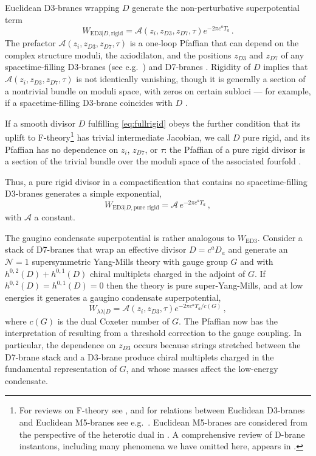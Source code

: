 \documentclass[12pt,a4wide]{article}
\begin{document}
Euclidean D3-branes wrapping  $D$ generate
the non-perturbative superpotential term
\begin{equation}\label{eq:wrigidnotpure}
W_{\text{ED3}|D,\text{rigid}} = \mathcal{A}(z_i,z_{D3},z_{D7},\tau) e^{-2\pi c^a T_a}\,.
\end{equation}
The prefactor $\mathcal{A}(z_i,z_{D3},z_{D7},\tau)$ is a one-loop Pfaffian that can depend on the complex structure moduli, the axiodilaton, and the positions $z_{D3}$ and $z_{D7}$ of any spacetime-filling D3-branes (see e.g.~\cite{Berg:2004ek,Baumann:2006cd,Kim:2022uni,Kim:2023cbh})
and D7-branes \cite{Cvetic:2012ts}.  Rigidity of $D$ implies that $\mathcal{A}(z_i,z_{D3},z_{D7},\tau)$ is not identically vanishing, though it is generally a section of a nontrivial bundle on moduli space, with zeros on certain subloci --- for example, if a spacetime-filling D3-brane coincides with $D$ \cite{Ganor:1996pe}.

If a smooth divisor $D$ fulfilling \eqref{eq:fullrigid}
obeys the further condition that its uplift to F-theory\footnote{For reviews on F-theory see \cite{Denef:2008wq,Weigand:2018rez}, and for 
relations between Euclidean D3-branes and Euclidean M5-branes see e.g.~\cite{Blumenhagen:2010ja}.
Euclidean M5-branes are considered from the perspective of the heterotic dual in \cite{Cvetic:2011gp}.  A comprehensive review of D-brane instantons, including many phenomena we have omitted here, appears in \cite{Blumenhagen:2009qh}.} has trivial intermediate Jacobian, we call $D$ pure rigid, and its Pfaffian has no dependence on $z_i$, $z_{D7}$, or $\tau$: the Pfaffian of a pure rigid divisor is a section of the trivial bundle over the moduli space of the associated fourfold \cite{Witten:1996hc}.

Thus, a pure rigid divisor in a compactification that contains no spacetime-filling D3-branes generates a simple exponential,
\begin{equation}\label{eq:wrigidpure}
W_{\text{ED3}|D,\text{pure rigid}} = \mathcal{A}\, e^{-2\pi c^a T_a}\,,
\end{equation}
with $\mathcal{A}$ a constant.

The gaugino condensate superpotential is rather analogous to $W_{\text{ED3}}$.  Consider a stack of D7-branes that wrap an effective divisor $D = c^a D_a$ and generate an $\mathcal{N}=1$ supersymmetric Yang-Mills theory with gauge group $G$ and with $h^{0,2}(D)+h^{0,1}(D)$
chiral multiplets charged in the adjoint of $G$.
If $h^{0,2}(D)=h^{0,1}(D)=0$ then the theory is pure super-Yang-Mills, and at low energies it generates a gaugino condensate superpotential,
\begin{equation}\label{eq:ll}
W_{\lambda\lambda|D} = \mathcal{A}(z_i,z_{D3},\tau) e^{-2\pi c^a T_a/c(G)}\,,
\end{equation} where  
$c(G)$ is the dual Coxeter number of $G$.
The Pfaffian now has the interpretation of resulting from a threshold correction to the gauge coupling.  In particular, the dependence on $z_{D3}$ occurs because strings stretched between the D7-brane stack and a D3-brane produce chiral multiplets charged in the fundamental representation of $G$, and whose masses affect the low-energy condensate.
\end{document}

